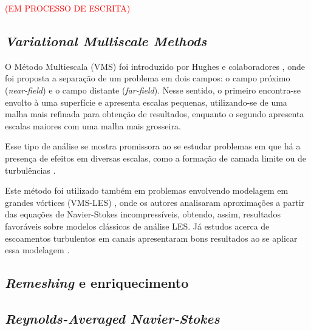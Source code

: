 \documentclass[_ArquivoPrincipal.tex]{subfiles}
\begin{document}
\textcolor{red}{(EM PROCESSO DE ESCRITA)}
\subsection{\textit{Variational Multiscale Methods}} \label{VMS}

O Método Multiescala (VMS) foi introduzido por Hughes e colaboradores \cite{hughes1995multiscale, hughes1996space, hughes1998variational}, onde foi proposta a separação de um problema em dois campos: o campo próximo (\textit{near-field}) e o campo distante (\textit{far-field}). Nesse sentido, o primeiro encontra-se envolto à uma superfície e apresenta escalas pequenas, utilizando-se de uma malha mais refinada para obtenção de resultados, enquanto o segundo apresenta escalas maiores com uma malha mais grosseira.

Esse tipo de análise se mostra promissora ao se estudar problemas em que há a presença de efeitos em diversas escalas, como a formação de camada limite ou de turbulências \cite{fernandes2020tecnica}.

Este método foi utilizado também em problemas envolvendo modelagem em grandes vórtices (VMS-LES) \cite{hughes2000large, bazilevs2007variational}, onde os autores analisaram aproximações a partir das equações de Navier-Stokes incompressíveis, obtendo, assim, resultados favoráveis sobre modelos clássicos de análise LES. Já estudos acerca de escoamentos turbulentos em canais apresentaram bons resultados ao se aplicar essa modelagem \cite{hughes2002variational}.

\subsection{\textit{Remeshing} e enriquecimento} \label{ReE}

\subsection{\textit{Reynolds-Averaged Navier-Stokes}} \label{RANS}
\end{document}
